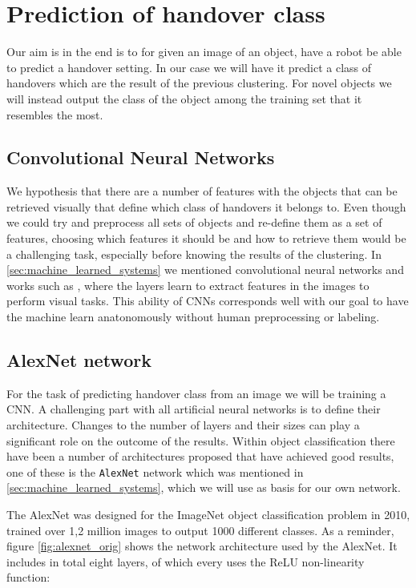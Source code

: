 %
%


\section{Prediction of handover class}

Our aim is in the end is to for given an image of an object, have a robot be able to predict a handover setting. In our case we will have it predict a class of handovers which are the result of the previous clustering. For novel objects we will instead output the class of the object among the training set that it resembles the most.

\subsection{Convolutional Neural Networks}

We hypothesis that there are a number of features with the objects that can be retrieved visually that define which class of handovers it belongs to. Even though we could try and preprocess all sets of objects and re-define them as a set of features, choosing which features it should be and how to retrieve them would be a challenging task, especially before knowing the results of the clustering. In \ref{sec:machine_learned_systems} we mentioned convolutional neural networks and works such as \parencite{Lee2009}, \parencite{Turaga2010} where the layers learn to extract features in the images to perform visual tasks. This ability of CNNs corresponds well with our goal to have the machine learn anatonomously without human preprocessing or labeling.

\subsection{AlexNet network}

For the task of predicting handover class from an image we will be training a CNN. A challenging part with all artificial neural networks is to define their architecture. Changes to the number of layers and their sizes can play a significant role on the outcome of the results. Within object classification there have been a number of architectures proposed that have achieved good results, one of these is the \texttt{AlexNet} network which was mentioned in \ref{sec:machine_learned_systems}, which we will use as basis for our own network.

The AlexNet was designed for the ImageNet object classification problem in 2010, trained over 1,2 million images to output 1000 different classes.
As a reminder, figure \ref{fig:alexnet_orig} shows the network architecture used by the AlexNet. It includes in total eight layers, of which every uses the ReLU non-linearity function:

